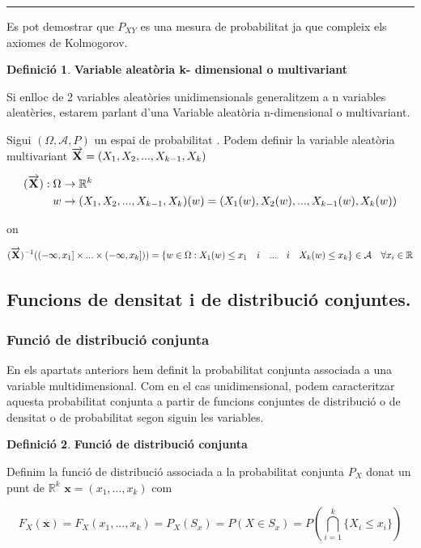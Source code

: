 \documentclass[
  catalan,
]{article}
\theoremstyle{definition}
\newtheorem{definition}{Definició}[section]
\theoremstyle{definition}
\theoremstyle{definition}
\theoremstyle{definition}
\theoremstyle{remark}
\begin{document}
\begin{center}\rule{0.5\linewidth}{0.5pt}\end{center}

Es pot demostrar que \(P_{XY}\) es una mesura de probabilitat ja que compleix els axiomes de Kolmogorov.

\begin{definition}
\textbf{Variable aleatòria k- dimensional o multivariant}

Si enlloc de 2 variables aleatòries unidimensionals generalitzem a n variables aleatèries, estarem parlant d'una Variable aleatòria n-dimensional o multivariant.

Sigui \((\Omega, \mathcal{A},P)\) un espai de probabilitat . Podem definir la variable aleatòria multivariant \(\overrightarrow{\bf{X}}=(X_1,X_2,...,X_{k-1},X_k)\)

\[
\begin{aligned}
(\overrightarrow{\bf{X}}): \Omega &\rightarrow \mathbb{R}^k \\
w & \rightarrow (X_1,X_2,...,X_{k-1},X_k)(w) =(X_1(w),X_2(w),...,X_{k-1}(w),X_k(w))
\end{aligned}
\]

on

\[
(\overrightarrow{\bf{X}})^{-1}(( -\infty, x_1] \times...  \times (-\infty, x_k]))=\{w \in \Omega: X_1(w) \leq x_1 \quad i \quad ... \quad i \quad  X_k(w) \leq x_k \} \in \mathcal{A} \quad \forall x_i \in \mathbb{R}
\]
\end{definition}

\subsection{Funcions de densitat i de distribució conjuntes.}\label{funcions-de-densitat-i-de-distribuciuxf3-conjuntes.}

\subsubsection{Funció de distribució conjunta}\label{funciuxf3-de-distribuciuxf3-conjunta}

En els apartats anteriors hem definit la probabilitat conjunta associada a una variable multidimensional. Com en el cas unidimensional, podem caracteritzar aquesta probabilitat conjunta a partir de funcions conjuntes de distribució o de densitat o de probabilitat segon siguin les variables.

\begin{definition}
\textbf{Funció de distribució conjunta}

Definim la funció de distribució associada a la probabilitat conjunta \(P_X\) donat un punt de \(\mathbb{R}^k\) \(\mathbf{x}=(x_1,...,x_k)\) com

\[
F_X( \mathbf{x} )=F_X(x_1,...,x_k) =P_X(S_x)=P(X \in S_x)= P(\bigcap_{i=1}^{k} \{ X_i\leq x_i \}) \label{eq:Fdistconjunt}
\]
\end{definition}
\end{document}
